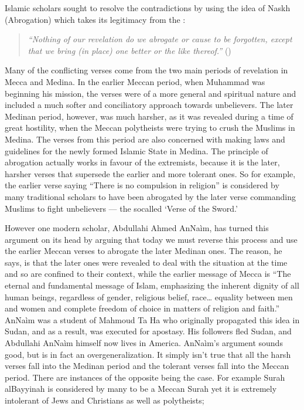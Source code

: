 \documentclass[12pt]{memoir}
\begin{document}
Islamic scholars sought to resolve the contradictions by using the idea
of Naskh (Abrogation) which takes its legitimacy from the \Quran:

\begin{quote}
\emph{“Nothing of our revelation do we abrogate or cause to be forgotten,
except that we bring (in place) one better or the like thereof.”}
()
\end{quote}

Many of the conflicting verses come from the two main periods
of revelation in Mecca and Medina.
In the earlier Meccan period, when Muhammad was beginning his mission,
the verses were of a more general and spiritual nature and included
a much softer and conciliatory approach towards unbelievers.
The later Medinan period, however, was much harsher,
as it was revealed during a time of great hostility,
when the Meccan polytheists were trying to crush the Muslims in Medina.
The verses from this period are also concerned with making laws
and guidelines for the newly formed Islamic State in Medina.
The principle of abrogation actually works in favour of the extremists,
because it is the later, harsher verses
that supersede the earlier and more tolerant ones.
So for example, the earlier verse saying “There is no compulsion in religion”
is considered by many traditional scholars to have been abrogated
by the later verse commanding Muslims to fight unbelievers —
the so\–called ‘Verse of the Sword.’

However one modern scholar, Abdullahi Ahmed An\–Na\`im,
has turned this argument on its head by arguing
that today we must reverse this process
and use the earlier Meccan verses to abrogate the later Medinan ones.
The reason, he says, is that the later ones were revealed to deal
with the situation at the time and so are confined to their context,
while the earlier message of Mecca is
“The eternal and fundamental message of Islam,
emphasizing the inherent dignity of all human beings,
regardless of gender, religious belief, race…
equality between men and women and complete freedom of choice
in matters of religion and faith.”
An\–Na\`im was a student of Mahmoud Ta Ha who originally propagated this idea
in Sudan, and as a result, was executed for apostasy.
His followers fled Sudan, and Abdullahi An\–Na\`im himself
now lives in America.
An\–Na\`im’s argument sounds good, but is in fact an over\–generalization.
It simply isn’t true that all the harsh verses fall into the Medinan period
and the tolerant verses fall into the Meccan period.
There are instances of the opposite being the case.
For example Surah al\–Bayyinah is considered by many to be a Meccan Surah
yet it is extremely intolerant of Jews and Christians as well as polytheists;
\end{document}
